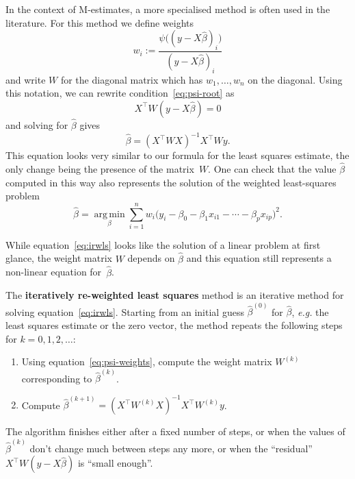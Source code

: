 \documentclass[
  a4paper,
]{article}
\theoremstyle{definition}
\theoremstyle{definition}
\theoremstyle{definition}
\theoremstyle{definition}
\theoremstyle{remark}
\begin{document}
In the context of M-estimates, a more specialised method is often used in the
literature. For this method we define weights
\begin{equation}
  w_i
  := \frac{\psi\bigl( (y - X\hat\beta)_i \bigr)}{(y - X\hat\beta)_i}
                                \label{eq:psi-weights}
\end{equation}
and write \(W\) for the diagonal matrix which has \(w_1, \ldots, w_n\)
on the diagonal. Using this notation, we can rewrite
condition~\eqref{eq:psi-root} as
\begin{equation*}
  X^\top W (y - X\hat\beta)
  = 0
\end{equation*}
and solving for \(\hat\beta\) gives
\begin{equation}
  \hat\beta
  = (X^\top W X)^{-1} X^\top W y. \label{eq:irwls}
\end{equation}
This equation looks very similar to our formula for the least squares
estimate, the only change being the presence of the matrix~\(W\).
One can check that the value \(\hat\beta\) computed in this way
also represents the solution of the weighted least-squares problem
\begin{equation*}
  \hat\beta
  = \mathop{\mathrm{arg\,min}}\limits_\beta \sum_{i=1}^n w_i \bigl( y_i - \beta_0 - \beta_1 x_{i1} - \cdots - \beta_p x_{ip} \bigr)^2.
\end{equation*}

While equation~\eqref{eq:irwls} looks like the solution of a linear problem at
first glance, the weight matrix \(W\) depends on \(\hat\beta\) and this equation
still represents a non-linear equation for~\(\hat\beta\).

The \textbf{iteratively re-weighted least squares} method is an iterative method
for solving equation~\eqref{eq:irwls}. Starting from an initial guess \(\hat\beta^{(0)}\)
for \(\hat\beta\), \emph{e.g.} the least squares estimate or the zero vector,
the method repeats the following steps for \(k = 0, 1, 2, \ldots\):

\begin{enumerate}
\def\labelenumi{\arabic{enumi}.}
\item
  Using equation~\eqref{eq:psi-weights}, compute the weight
  matrix \(W^{(k)}\) corresponding to \(\hat\beta^{(k)}\).
\item
  Compute \(\displaystyle\hat\beta^{(k+1)} = (X^\top W^{(k)} X)^{-1} X^\top W^{(k)} y\).
\end{enumerate}

The algorithm finishes either after a fixed number of steps, or when the values
of \(\hat\beta^{(k)}\) don't change much between steps any more, or when the
``residual'' \(X^\top W (y - X\hat\beta)\) is ``small enough''.
\end{document}
